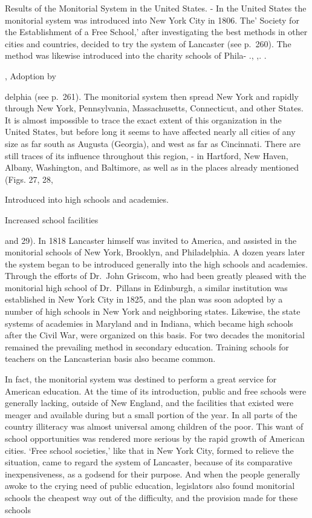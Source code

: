 \documentclass[]{book}
\begin{document}
Results of the Monitorial System in the United States. - In the United States the monitorial system was introduced into New York City in 1806. The' Society for the Establishment of a Free School,' after investigating the best methods in other cities and countries, decided to try the system of Lancaster (see p.~260). The method was likewise introduced into the charity schools of Phila- ., ,. .

, Adoption by

delphia (see p.~261). The monitorial system then spread New York and rapidly through New York, Pennsylvania, Massachusetts, Connecticut, and other States. It is almost impossible to trace the exact extent of this organization in the United States, but before long it seems to have affected nearly all cities of any size as far south as Augusta (Georgia), and west as far as Cincinnati. There are still traces of its influence throughout this region, - in Hartford, New Haven, Albany, Washington, and Baltimore, as well as in the places already mentioned (Figs. 27, 28,

Introduced into high schools and academies.

Increased school facilities

and 29). In 1818 Lancaster himself was invited to America, and assisted in the monitorial schools of New York, Brooklyn, and Philadelphia. A dozen years later the system began to be introduced generally into the high schools and academies. Through the efforts of Dr.~John Griscom, who had been greatly pleased with the monitorial high school of Dr.~Pillans in Edinburgh, a similar institution was established in New York City in 1825, and the plan was soon adopted by a number of high schools in New York and neighboring states. Likewise, the state systems of academies in Maryland and in Indiana, which became high schools after the Civil War, were organized on this basis. For two decades the monitorial remained the prevailing method in secondary education. Training schools for teachers on the Lancasterian basis also became common.

In fact, the monitorial system was destined to perform a great service for American education. At the time of its introduction, public and free schools were generally lacking, outside of New England, and the facilities that existed were meager and available during but a small portion of the year. In all parts of the country illiteracy was almost universal among children of the poor. This want of school opportunities was rendered more serious by the rapid growth of American cities. `Free school societies,' like that in New York City, formed to relieve the situation, came to regard the system of Lancaster, because of its comparative inexpensiveness, as a godsend for their purpose. And when the people generally awoke to the crying need of public education, legislators also found monitorial schools the cheapest way out of the difficulty, and the provision made for these schools
\end{document}
